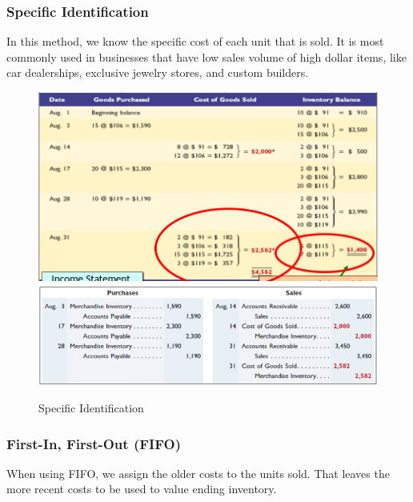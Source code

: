 \documentclass[../main.tex]{subfiles}
\begin{document}
	\subsubsection{Specific Identification}
	
	In this method, we know the specific cost of each unit that is sold. It is 
	most commonly used in businesses that have low sales volume of high dollar 
	items, like car dealerships, exclusive jewelry stores, and custom builders.
	
	\begin{figure}[ht]
		\centering
		\includegraphics[width=\columnwidth]{images/c7/specific_id.png}
		\includegraphics[width=\columnwidth]{images/c7/specific_id_eg1.png}
		\caption{Specific Identification}
	\end{figure}

	\subsubsection{First-In, First-Out (FIFO)}
	
	When using FIFO, we assign the older costs to the units sold. That leaves 
	the more recent costs to be used to value ending inventory.
	
\end{document}
